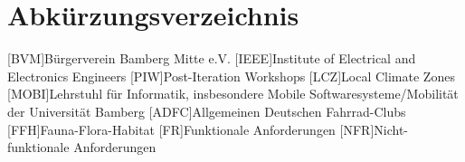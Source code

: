 \chapter*{Abkürzungsverzeichnis}

\begin{acronym}
    [BVM]{Bürgerverein Bamberg Mitte e.V.}
    [IEEE]{Institute of Electrical and Electronics Engineers}
    [PIW]{Post-Iteration Workshops}
    [LCZ]{Local Climate Zones}
    [MOBI]{Lehrstuhl für Informatik, insbesondere Mobile Softwaresysteme/Mobilität der Universität Bamberg}
    [ADFC]{Allgemeinen Deutschen Fahrrad-Clubs}
    [FFH]{Fauna-Flora-Habitat}
    [FR]{Funktionale Anforderungen}
    [NFR]{Nicht-funktionale Anforderungen}
\end{acronym}
